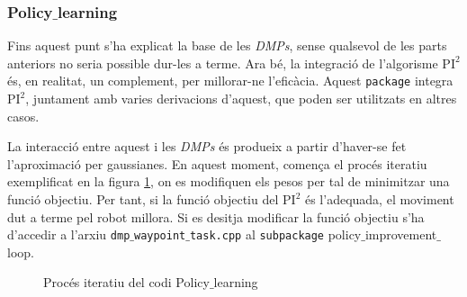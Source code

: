 \documentclass[12pt,a4paper,final,twoside]{report}
\begin{document}
\subsubsection{Policy$\_$learning}

Fins aquest punt s'ha explicat la base de les \textit{DMPs}, sense qualsevol de les parts anteriors no seria possible dur-les a terme. Ara bé, la integració de l'algorisme $\mathrm{PI^2}$ és, en realitat, un complement, per millorar-ne l'eficàcia. Aquest \texttt{package} integra $\mathrm{PI^2}$, juntament amb varies derivacions d'aquest, que poden ser utilitzats en altres casos.

La interacció entre aquest i les \textit{DMPs} és produeix a partir d'haver-se fet l'aproximació per gaussianes. En aquest moment, comença el procés iteratiu exemplificat en la figura \ref{fig:iteracio-policy-learning}, on es modifiquen els pesos per tal de minimitzar una funció objectiu. Per tant, si la funció objectiu del $\mathrm{PI^2}$ és l'adequada, el moviment dut a terme pel robot millora. Si es desitja modificar la funció objectiu s'ha d'accedir a l'arxiu \texttt{dmp$\_$waypoint$\_$task.cpp} al \texttt{subpackage} policy$\_$improvement$\_$loop.\\

\begin{figure}[bt]
\centering
\resizebox{\textwidth}{!}{}
\caption{Procés iteratiu del codi Policy$\_$learning}
\label{fig:iteracio-policy-learning}
\end{figure}






\end{document}
